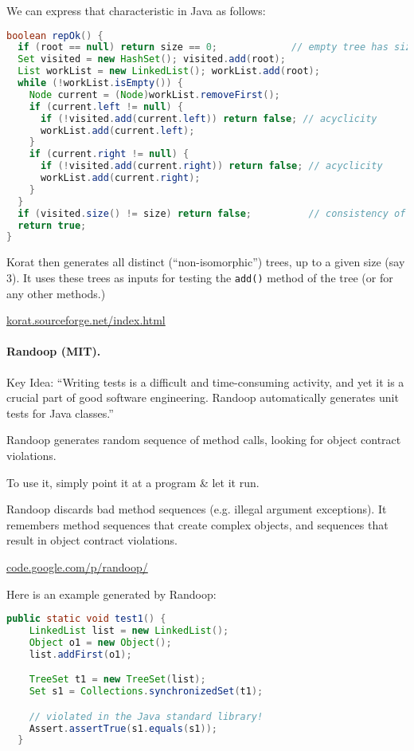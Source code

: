 \documentclass[11pt]{article}
\begin{document}
\newpage We can express that characteristic in Java as follows:
\begin{lstlisting}[language=Java]
boolean repOk() {
  if (root == null) return size == 0; 	   	      // empty tree has size 0
  Set visited = new HashSet(); visited.add(root);
  List workList = new LinkedList(); workList.add(root);
  while (!workList.isEmpty()) {
    Node current = (Node)workList.removeFirst();
    if (current.left != null) {
      if (!visited.add(current.left)) return false; // acyclicity
      workList.add(current.left);
    }
    if (current.right != null) {
      if (!visited.add(current.right)) return false; // acyclicity
      workList.add(current.right);
    }
  }
  if (visited.size() != size) return false; 	     // consistency of size
  return true;
}
\end{lstlisting}

Korat then generates all distinct (``non-isomorphic'') trees, 
    up to a given size (say 3).
It uses these trees as inputs for testing 
    the {\tt add()} method of the tree (or for any other methods.)

    \begin{center}
    \url{korat.sourceforge.net/index.html}
  \end{center}

    \paragraph{Randoop (MIT).}
    Key Idea:
    ``Writing tests is a difficult and time-consuming activity, 
  and yet it is a crucial part of good software engineering. 
  Randoop automatically generates unit tests for Java classes.''

  Randoop generates random sequence of method calls, 
  looking for object contract violations.
  
  To use it, simply point it at a program \& let it run.

  Randoop discards bad method sequences 
(e.g. illegal argument exceptions). It remembers method sequences that create complex objects,
    and sequences that result in object contract violations.\

  \begin{center}
    \url{code.google.com/p/randoop/}
  \end{center}

  Here is an example generated by Randoop:
  {\scriptsize
\begin{lstlisting}[language=Java]
public static void test1() {
    LinkedList list = new LinkedList();
    Object o1 = new Object();
    list.addFirst(o1);

    TreeSet t1 = new TreeSet(list);
    Set s1 = Collections.synchronizedSet(t1);

    // violated in the Java standard library!
    Assert.assertTrue(s1.equals(s1));
  }
\end{lstlisting}
}
\end{document}
